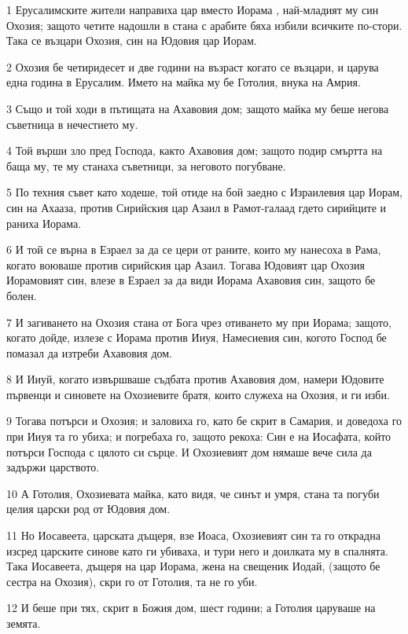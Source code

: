 \par 1 Ерусалимските жители направиха цар вместо Иорама , най-младият му син Охозия; защото четите надошли в стана с арабите бяха избили всичките по-стори. Така се възцари Охозия, син на Юдовия цар Иорам.
\par 2 Охозия бе четиридесет и две години на възраст когато се възцари, и царува една година в Ерусалим. Името на майка му бе Готолия, внука на Амрия.
\par 3 Също и той ходи в пътищата на Ахавовия дом; защото майка му беше негова съветница в нечестието му.
\par 4 Той върши зло пред Господа, както Ахавовия дом; защото подир смъртта на баща му, те му станаха съветници, за неговото погубване.
\par 5 По техния съвет като ходеше, той отиде на бой заедно с Израилевия цар Иорам, син на Ахааза, против Сирийския цар Азаил в Рамот-галаад гдето сирийците и раниха Иорама.
\par 6 И той се върна в Езраел за да се цери от раните, които му нанесоха в Рама, когато воюваше против сирийския цар Азаил. Тогава Юдовият цар Охозия Иорамовият син, влезе в Езраел за да види Иорама Ахавовия син, защото бе болен.
\par 7 И загиването на Охозия стана от Бога чрез отиването му при Иорама; защото, когато дойде, излезе с Иорама против Ииуя, Намесиевия син, когото Господ бе помазал да изтреби Ахавовия дом.
\par 8 И Ииуй, когато извършваше съдбата против Ахавовия дом, намери Юдовите първенци и синовете на Охозиевите братя, които служеха на Охозия, и ги изби.
\par 9 Тогава потърси и Охозия; и заловиха го, като бе скрит в Самария, и доведоха го при Ииуя та го убиха; и погребаха го, защото рекоха: Син е на Иосафата, който потърси Господа с цялото си сърце. И Охозиевият дом нямаше вече сила да задържи царството.
\par 10 А Готолия, Охозиевата майка, като видя, че синът и умря, стана та погуби целия царски род от Юдовия дом.
\par 11 Но Иосавеета, царската дъщеря, взе Иоаса, Охозиевият син та го открадна изсред царските синове като ги убиваха, и тури него и доилката му в спалнята. Така Иосавеета, дъщеря на цар Иорама, жена на свещеник Иодай, (защото бе сестра на Охозия), скри го от Готолия, та не го уби.
\par 12 И беше при тях, скрит в Божия дом, шест години; а Готолия царуваше на земята.

